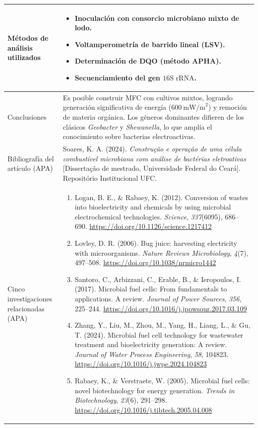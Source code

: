 \documentclass[12pt]{article}
\begin{document}
\begin{longtable}{|p{4.5cm}|p{11.5cm}|}
Métodos de análisis utilizados &
\begin{itemize}[leftmargin=0.4cm, nosep]
    \item Inoculación con consorcio microbiano mixto de lodo.
    \item Voltamperometría de barrido lineal (LSV).
    \item Determinación de DQO (método APHA).
    \item Secuenciamiento del gen $16\text{S rRNA}$.
\end{itemize} \\ \hline

Conclusiones &
Es posible construir MFC con cultivos mixtos, logrando generación significativa
de energía ($600\ \text{mW/m}^2$) y remoción de materia orgánica. Los géneros
dominantes difieren de los clásicos \textit{Geobacter} y \textit{Shewanella},
lo que amplía el conocimiento sobre bacterias electroactivas. \\ \hline

Bibliografía del artículo (APA) &
Soares, K. A. (2024). \textit{Construção e operação de uma célula combustível
microbiana com análise de bactérias eletroativas} [Dissertação de mestrado,
Universidade Federal do Ceará]. Repositório Institucional UFC. \\ \hline

Cinco investigaciones relacionadas (APA) &
\begin{enumerate}[leftmargin=0.4cm, nosep]
    \item Logan, B. E., \& Rabaey, K. (2012). Conversion of wastes into
          bioelectricity and chemicals by using microbial electrochemical
          technologies. \textit{Science}, \textit{337}(6095), 686--690.
          \url{https://doi.org/10.1126/science.1217412}
    \item Lovley, D. R. (2006). Bug juice: harvesting electricity with
          microorganisms. \textit{Nature Reviews Microbiology},
          \textit{4}(7), 497--508.
          \url{https://doi.org/10.1038/nrmicro1442}
    \item Santoro, C., Arbizzani, C., Erable, B., \& Ieropoulos, I. (2017).
          Microbial fuel cells: From fundamentals to applications. A review.
          \textit{Journal of Power Sources}, \textit{356}, 225--244.
          \url{https://doi.org/10.1016/j.jpowsour.2017.03.109}
    \item Zhang, Y., Liu, M., Zhou, M., Yang, H., Liang, L., \& Gu, T.
          (2024). Microbial fuel cell technology for wastewater treatment and
          bioelectricity generation: A review. \textit{Journal of Water
          Process Engineering}, \textit{58}, 104823.
          \url{https://doi.org/10.1016/j.jwpe.2024.104823}
    \item Rabaey, K., \& Verstraete, W. (2005). Microbial fuel cells: novel
          biotechnology for energy generation. \textit{Trends in
          Biotechnology}, \textit{23}(6), 291--298.
          \url{https://doi.org/10.1016/j.tibtech.2005.04.008}
\end{enumerate} \\ \hline
\end{longtable}
\end{document}
